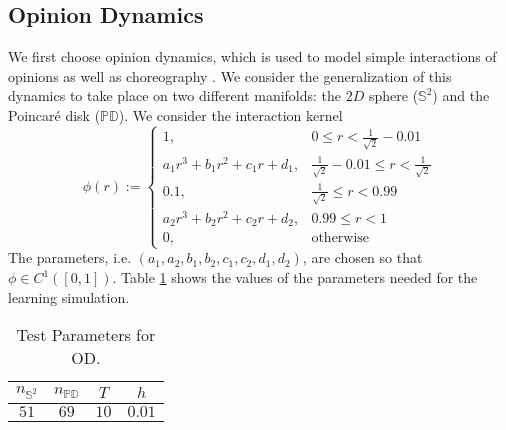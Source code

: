 \documentclass[11pt]{article}
\newcommand{\intkernel}{\phi}
\begin{document}
\subsection{Opinion Dynamics}
%
We first choose opinion dynamics, which is used to model simple interactions of opinions \cite{OpinionDynamicsAylin2017, continuousOD} as well as choreography \cite{CLP2014}.  We consider the generalization of this dynamics to take place on two different manifolds: the $2D$ sphere ($\mathbb{S}^2$) and the Poincar\'{e} disk ($\mathbb{PD}$).
We consider the interaction kernel
\[
\intkernel(r) := \left\{
        \begin{array}{ll}
            1,                            & 0                         \le r < \frac{1}{\sqrt{2}} - 0.01 \\
            a_1r^3 + b_1r^2 + c_1r + d_1, & \frac{1}{\sqrt{2}} - 0.01 \le r < \frac{1}{\sqrt{2}} \\
            0.1,                          & \frac{1}{\sqrt{2}}        \le r < 0.99 \\
            a_2r^3 + b_2r^2 + c_2r + d_2, & 0.99                      \le r < 1 \\
            0,   & \text{otherwise}
        \end{array}
    \right.
\]
The parameters, i.e. $(a_1,a_2, b_1,b_2, c_1,c_2, d_1,d_2)$, are chosen so that $\intkernel \in C^1([0, 1])$.  Table \ref{tab:OD_params} shows the values of the parameters needed for the learning simulation.
\begin{table}[H]
\centering
\small{
\small{\begin{tabular}{ c | c | c | c }
$n_{\mathbb{S}^2}$ & $n_{\mathbb{PD}}$ & $T$  & $h$ \\
\hline
$51$      & $69$            & $10$ & $0.01$ \\
\end{tabular}}  
}
\caption{Test Parameters for OD.}
\label{tab:OD_params} 
\end{table}
\end{document}

